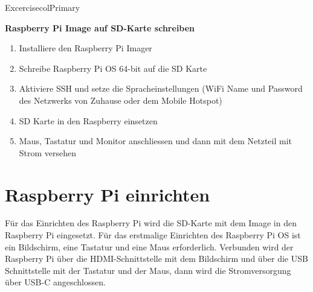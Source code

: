 \documentclass[
  11pt,
  a4paper,
  oneside, openany  ,captions=tableheading
]{scrbook}
\providecommand{\tightlist}{%
  \setlength{\itemsep}{0pt}\setlength{\parskip}{0pt}}
\theoremstyle{remark}
\begin{document}
\begin{boxtitle}{Excercise}{colPrimary}

\textbf{Raspberry Pi Image auf SD-Karte schreiben}

\begin{enumerate}
\def\labelenumi{\arabic{enumi}.}
\tightlist
\item
  Installiere den Raspberry Pi Imager
\item
  Schreibe Raspberry Pi OS 64-bit auf die SD Karte
\item
  Aktiviere SSH und setze die Spracheinstellungen (WiFi Name und
  Password des Netzwerks von Zuhause oder dem Mobile Hotspot)
\item
  SD Karte in den Raspberry einsetzen
\item
  Maus, Tastatur und Monitor anschliessen und dann mit dem Netzteil mit
  Strom versehen
\end{enumerate}

\end{boxtitle}

\section{Raspberry Pi einrichten}\label{raspberry-pi-einrichten}

Für das Einrichten des Raspberry Pi wird die SD-Karte mit dem Image in
den Raspberry Pi eingesetzt. Für das erstmalige Einrichten des Raspberry
Pi OS ist ein Bildschirm, eine Tastatur und eine Maus erforderlich.
Verbunden wird der Raspberry Pi über die HDMI-Schnittstelle mit dem
Bildschirm und über die USB Schnittstelle mit der Tastatur und der Maus,
dann wird die Stromversorgung über USB-C angeschlossen.
\end{document}
